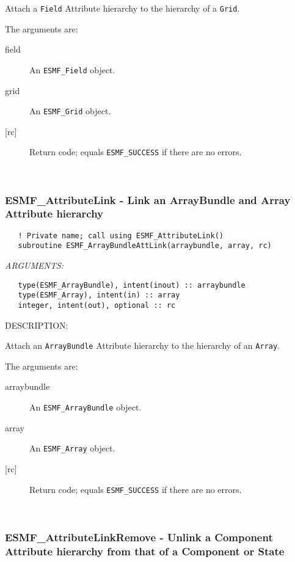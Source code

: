    Attach a {\tt Field} Attribute hierarchy to the hierarchy of
   a {\tt Grid}.
  
   The arguments are:
   \begin{description}
   \item [field]
   An {\tt ESMF\_Field} object.
   \item [grid]
   An {\tt ESMF\_Grid} object.
   \item [{[rc]}]
   Return code; equals {\tt ESMF\_SUCCESS} if there are no errors.
   \end{description}
  
   
 
\mbox{}\hrulefill\ 
 
\subsubsection [ESMF\_AttributeLink] {ESMF\_AttributeLink - Link an ArrayBundle and Array Attribute hierarchy}


  
\begin{verbatim}   ! Private name; call using ESMF_AttributeLink()
   subroutine ESMF_ArrayBundleAttLink(arraybundle, array, rc)\end{verbatim}{\em ARGUMENTS:}
\begin{verbatim}   type(ESMF_ArrayBundle), intent(inout) :: arraybundle
   type(ESMF_Array), intent(in) :: array
   integer, intent(out), optional :: rc\end{verbatim}
{\sf DESCRIPTION:\\ }


   Attach an {\tt ArrayBundle} Attribute hierarchy to the hierarchy of
   an {\tt Array}.
  
   The arguments are:
   \begin{description}
   \item [arraybundle]
   An {\tt ESMF\_ArrayBundle} object.
   \item [array]
   An {\tt ESMF\_Array} object.
   \item [{[rc]}]
   Return code; equals {\tt ESMF\_SUCCESS} if there are no errors.
   \end{description}
  
   
 
\mbox{}\hrulefill\ 
 
\subsubsection [ESMF\_AttributeLinkRemove] {ESMF\_AttributeLinkRemove - Unlink a Component Attribute hierarchy from that of a Component or State}


